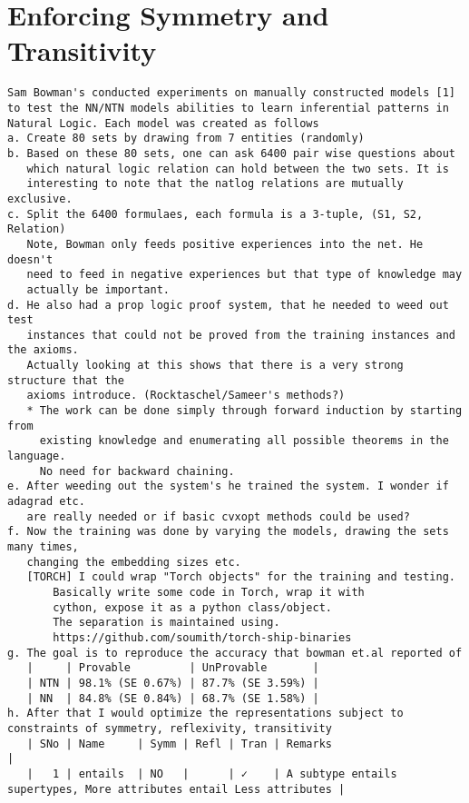 \documentclass[12pt]{exam} %
\newcommand{\remove}[0]{}
\newcommand{\remove}[1]{}
\begin{document}
\remove{
\section{Enforcing Symmetry and Transitivity}
\label{sec:enforc-symm-trans}
\begin{Verbatim}[fontsize=\small]
Sam Bowman's conducted experiments on manually constructed models [1]
to test the NN/NTN models abilities to learn inferential patterns in
Natural Logic. Each model was created as follows
a. Create 80 sets by drawing from 7 entities (randomly)
b. Based on these 80 sets, one can ask 6400 pair wise questions about
   which natural logic relation can hold between the two sets. It is
   interesting to note that the natlog relations are mutually exclusive.
c. Split the 6400 formulaes, each formula is a 3-tuple, (S1, S2, Relation)
   Note, Bowman only feeds positive experiences into the net. He doesn't
   need to feed in negative experiences but that type of knowledge may
   actually be important.
d. He also had a prop logic proof system, that he needed to weed out test
   instances that could not be proved from the training instances and the axioms.
   Actually looking at this shows that there is a very strong structure that the
   axioms introduce. (Rocktaschel/Sameer's methods?)
   * The work can be done simply through forward induction by starting from
     existing knowledge and enumerating all possible theorems in the language.
     No need for backward chaining.
e. After weeding out the system's he trained the system. I wonder if adagrad etc.
   are really needed or if basic cvxopt methods could be used?
f. Now the training was done by varying the models, drawing the sets many times,
   changing the embedding sizes etc.
   [TORCH] I could wrap "Torch objects" for the training and testing.
       Basically write some code in Torch, wrap it with
       cython, expose it as a python class/object.
       The separation is maintained using.
       https://github.com/soumith/torch-ship-binaries
g. The goal is to reproduce the accuracy that bowman et.al reported of
   |     | Provable         | UnProvable       |
   | NTN | 98.1% (SE 0.67%) | 87.7% (SE 3.59%) |
   | NN  | 84.8% (SE 0.84%) | 68.7% (SE 1.58%) |
h. After that I would optimize the representations subject to constraints of symmetry, reflexivity, transitivity
   | SNo | Name     | Symm | Refl | Tran | Remarks                                                              |
   |   1 | entails  | NO   |      | ✓    | A subtype entails supertypes, More attributes entail Less attributes |

\end{Verbatim}}
\end{document}
